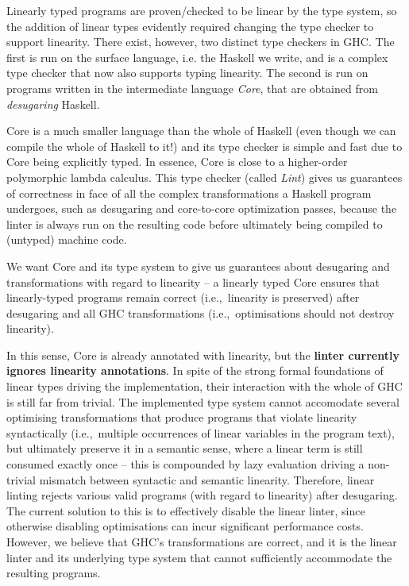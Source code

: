 \documentclass[a4paper, draft]{report}
\begin{document}
Linearly typed programs are proven/checked to be linear by the type system, so
the addition of linear types evidently required changing the type checker to
support linearity. There exist, however, two distinct type checkers in GHC.
The first is run on the surface language, i.e. the Haskell we write, and is a
complex type checker that now also supports typing linearity. The second is
run on programs written in the intermediate language \emph{Core}, that
are obtained from \emph{desugaring} Haskell.

Core is a much smaller language than the whole of Haskell (even though we
can compile the whole of Haskell to it!) and its type checker is
simple and fast due to Core being explicitly typed. In essence, Core
is close to a higher-order polymorphic lambda calculus. This type
checker (called \emph{Lint}) gives us guarantees of correctness in face of all
the complex transformations a Haskell program undergoes, such as desugaring and
core-to-core optimization passes, because the linter is always run on the resulting code
before ultimately being compiled to (untyped) machine code.


We want Core and its type system to give us guarantees about
desugaring and transformations with regard to linearity -- a linearly
typed Core ensures that linearly-typed programs remain correct
(i.e.,~linearity is preserved) after desugaring and all GHC
transformations (i.e.,~optimisations should not destroy linearity).

In this sense, Core is already annotated with linearity, but the \textbf{linter currently
  ignores linearity annotations}.
%
In spite of the strong formal foundations of linear types driving the
implementation, their interaction with the whole of GHC is still far
from trivial. The implemented type system cannot accomodate
several optimising transformations that produce programs that violate
linearity syntactically (i.e.,~multiple occurrences of linear
variables in the program text), but ultimately preserve it in a
semantic sense, where a linear term is still consumed exactly once --
this is compounded by lazy evaluation driving a non-trivial mismatch
between syntactic and semantic linearity. Therefore, linear linting
rejects various valid programs (with regard to linearity) after
desugaring. The current solution to this is to effectively disable the
linear linter, since otherwise disabling optimisations can incur significant
performance costs. However, we believe that GHC's transformations are
correct, and it is the linear linter and its underlying type system
that cannot sufficiently accommodate the
resulting programs.
\end{document}
